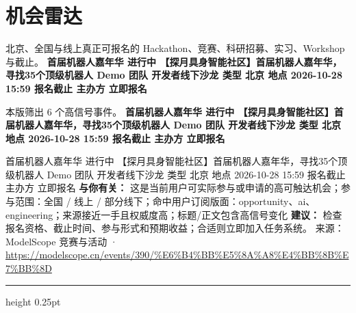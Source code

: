 \documentclass[10.5pt]{ctexart}
\begin{document}
\section*{机会雷达}
{\color{ormuted} 北京、全国与线上真正可报名的 Hackathon、竞赛、科研招募、实习、Workshop 与截止。}
\vspace{2mm}
{\LARGE\bfseries 首届机器人嘉年华 进行中 【探月具身智能社区】首届机器人嘉年华，寻找35个顶级机器人 Demo 团队 开发者线下沙龙 类型 北京 地点 2026-10-28 15:59 报名截止 主办方 立即报名}\par
\vspace{1mm}
{\color{ormuted} 本版筛出 6 个高信号事件。}
\vspace{3mm}
{\Large\bfseries 首届机器人嘉年华 进行中 【探月具身智能社区】首届机器人嘉年华，寻找35个顶级机器人 Demo 团队 开发者线下沙龙 类型 北京 地点 2026-10-28 15:59 报名截止 主办方 立即报名}\par
首届机器人嘉年华 进行中 【探月具身智能社区】首届机器人嘉年华，寻找35个顶级机器人 Demo 团队 开发者线下沙龙 类型 北京 地点 2026-10-28 15:59 报名截止 主办方 立即报名
\textbf{与你有关：} 这是当前用户可实际参与或申请的高可触达机会；参与范围：全国 / 线上 / 部分线下；命中用户订阅版面：opportunity、ai、engineering；来源接近一手且权威度高；标题/正文包含高信号变化
\textbf{建议：} 检查报名资格、截止时间、参与形式和预期收益；合适则立即加入任务系统。
{\footnotesize\color{ormuted} 来源：ModelScope 竞赛与活动 · \url{https://modelscope.cn/events/390/%E6%B4%BB%E5%8A%A8%E4%BB%8B%E7%BB%8D}}
\vspace{4mm}
\hrule height 0.25pt
\vspace{3mm}
\end{document}
